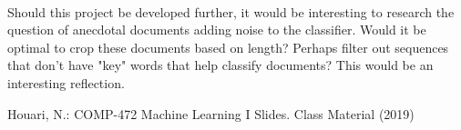 \documentclass[]{llncs}
\begin{document}
\paragraph{}
Should this project be developed further, it would be interesting to research the question of anecdotal documents adding noise to the classifier. Would it be optimal to crop these documents based on length? Perhaps filter out sequences that don't have "key" words that help classify documents? This would be an interesting reflection.

\begin{thebibliography}{8}
Houari, N.: COMP-472 Machine Learning I Slides. Class Material (2019)
\end{thebibliography}
\end{document}
